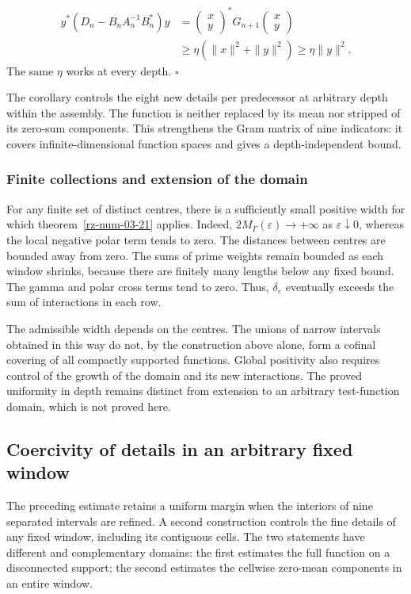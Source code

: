 \[
\begin{aligned}
y^*(D_n-B_nA_n^{-1}B_n^*)y
&=\begin{pmatrix}x\\y\end{pmatrix}^*G_{n+1}
\begin{pmatrix}x\\y\end{pmatrix}\\
&\geq\eta(\|x\|^2+\|y\|^2)\geq\eta\|y\|^2.
\end{aligned}
\]
The same \(\eta\) works at every depth. \hfill\(\square\)

The corollary controls the eight new details per predecessor at arbitrary depth within the assembly. The function is neither replaced by its mean nor stripped of its zero-sum components. This strengthens the Gram matrix of nine indicators: it covers infinite-dimensional function spaces and gives a depth-independent bound.

\subsubsection*{Finite collections and extension of the domain}
For any finite set of distinct centres, there is a sufficiently small positive width for which theorem~\ref{rz-num-03-21} applies. Indeed, \(2M_\Gamma(\varepsilon)\to+\infty\) as \(\varepsilon\downarrow0\), whereas the local negative polar term tends to zero. The distances between centres are bounded away from zero. The sums of prime weights remain bounded as each window shrinks, because there are finitely many lengths below any fixed bound. The gamma and polar cross terms tend to zero. Thus, \(\delta_\varepsilon\) eventually exceeds the sum of interactions in each row.

The admissible width depends on the centres. The unions of narrow intervals obtained in this way do not, by the construction above alone, form a cofinal covering of all compactly supported functions. Global positivity also requires control of the growth of the domain and its new interactions. The proved uniformity in depth remains distinct from extension to an arbitrary test-function domain, which is not proved here.

\subsection{Coercivity of details in an arbitrary fixed window}
\label{rz:detalles}
The preceding estimate retains a uniform margin when the interiors of nine separated intervals are refined. A second construction controls the fine details of any fixed window, including its contiguous cells. The two statements have different and complementary domains: the first estimates the full function on a disconnected support; the second estimates the cellwise zero-mean components in an entire window.

